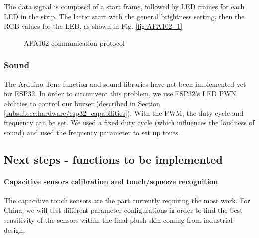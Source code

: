 \medskip The data signal is composed of a start frame, followed by LED frames for each LED in the strip. The latter start with the general brightness setting, then the RGB values for the LED, as shown in Fig. \ref{fig:APA102_1}  

\begin{figure}[H]
    \centering
    \hfill
    \caption{APA102 communication protocol} 
    \label{fig:APA102}
\end{figure}   
   


    \subsubsection{Sound}
The Arduino Tone function and sound libraries have not been implemented yet for ESP32. In order to circumvent this problem, we use ESP32's LED PWN abilities to control our buzzer (described in Section \ref{subsubsec:hardware/esp32_capabilities}). With the PWM, the duty cycle and frequency can be set. We used a fixed duty cycle (which influences the loudness of sound) and used the frequency parameter to set up tones.





\subsection{Next steps - functions to be implemented}
    \paragraph{Capacitive sensors calibration and touch/squeeze recognition} The capacitive touch sensors are the part currently requiring the most work. For China, we will test different parameter configurations in order to find the best sensitivity of the sensors within the final plush skin coming from industrial design. 
